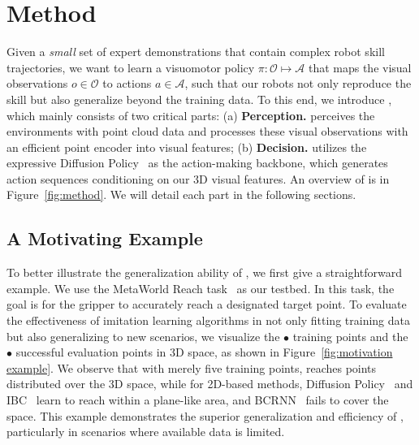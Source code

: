 
\section{Method}
Given a \textit{small} set of expert demonstrations that contain complex robot skill trajectories, we want to learn a visuomotor policy $\pi: \mathcal{O}\mapsto\mathcal{A}$ that maps the visual observations $o\in \mathcal{O}$ to actions $a\in \mathcal{A}$, such that our robots not only reproduce the skill but also generalize beyond the training data. To this end, we introduce \textbf{\oursfull}, which mainly consists of two critical parts: (a) \textbf{Perception.} \ours perceives the environments with point cloud data and processes these visual observations with an efficient point encoder into visual features; (b) \textbf{Decision.} \ours utilizes the expressive Diffusion Policy~\citep{chi2023diffusion_policy} as the action-making backbone, which generates action sequences conditioning on our 3D visual features. An overview of \ours is in Figure~\ref{fig:method}. We will detail each part in the following sections.



\subsection{A Motivating Example}
To better illustrate the generalization ability of \ours, we first give a straightforward example. We use the MetaWorld Reach task~\citep{yu2020metaworld} as our testbed. In this task, the goal is for the gripper to accurately reach a designated target point. To evaluate the effectiveness of imitation learning algorithms in not only fitting training data but also generalizing to new scenarios, we visualize the \textcolor{deepred}{$\bullet$} training points and the \textcolor{deepblue}{$\bullet$} successful evaluation points in 3D space, as shown in Figure~\ref{fig:motivation example}. We observe that with merely five training points, \ours reaches points distributed over the 3D space, while for 2D-based methods, Diffusion Policy~\citep{chi2023diffusion_policy} and IBC~\citep{florence2022ibc} learn to reach within a plane-like area, and  BCRNN~\citep{mandlekar2021robomimic} fails to cover the space. This example demonstrates the superior generalization and efficiency of \ours, particularly in scenarios where available data is limited.

